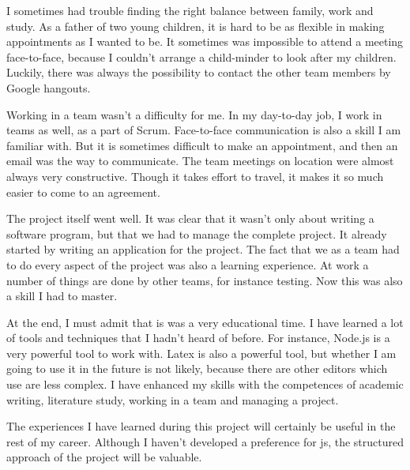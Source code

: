 I sometimes had trouble finding the right balance between family, work and study.
As a father of two young children, it is hard to be as flexible in making
appointments as I wanted to be.
It sometimes was impossible to attend a meeting face-to-face, because I couldn't
arrange a child-minder to look after my children.
Luckily, there was always the possibility to contact the other team members by
Google hangouts.

Working in a team wasn't a difficulty for me. In my day-to-day job, I work in
teams as well, as a part of Scrum. Face-to-face communication is also a skill I
am familiar with.
But it is sometimes difficult to make an appointment, and then an email was the
way to communicate. 
The team meetings on location were almost always very constructive.
Though it takes effort to travel, it makes it so much easier to come to an
agreement.

The project itself went well.
It was clear that it wasn't only about writing a software program, but that we
had to manage the complete project.
It already started by writing an application for the project.
The fact that we as a team had to do every aspect of the project was also a
learning experience. 
At work a number of things are done by other teams, for instance testing.
Now this was also a skill I had to master.

At the end, I must admit that is was a very educational time. I have learned a lot of tools and techniques that I hadn't heard of before.
For instance, Node.js is a very powerful tool to work with.
Latex is also a powerful tool, but whether I am going to use it in the future is
not likely, because there are other editors which use are less complex.
I have enhanced my skills with the competences of academic writing, literature
study, working in a team and managing a project.

The experiences I have learned during this project will certainly be useful in
the rest of my career. Although I haven't developed a preference for \gls{js},
the structured approach of the project will be valuable.
